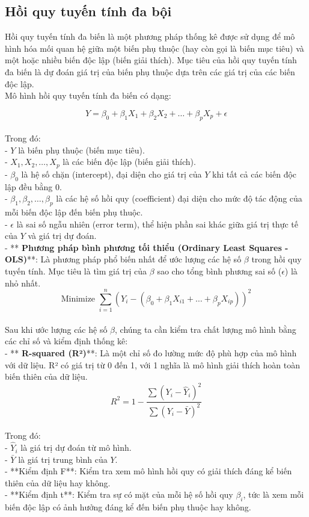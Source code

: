 \subsection{Hồi quy tuyến tính đa bội}
Hồi quy tuyến tính đa biến là một phương pháp thống kê được sử dụng để mô hình hóa mối quan hệ giữa một biến phụ thuộc (hay còn gọi là biến mục tiêu) và một hoặc nhiều biến độc lập (biến giải thích). Mục tiêu của hồi quy tuyến tính đa biến là dự đoán giá trị của biến phụ thuộc dựa trên các giá trị của các biến độc lập.\\
Mô hình hồi quy tuyến tính đa biến có dạng:

\[
Y = \beta_0 + \beta_1 X_1 + \beta_2 X_2 + \dots + \beta_p X_p + \epsilon
\]\\

Trong đó:\\
- \(Y\) là biến phụ thuộc (biến mục tiêu).\\
- \(X_1, X_2, \dots, X_p\) là các biến độc lập (biến giải thích).\\
- \(\beta_0\) là hệ số chặn (intercept), đại diện cho giá trị của \(Y\) khi tất cả các biến độc lập đều bằng 0.\\
- \(\beta_1, \beta_2, \dots, \beta_p\) là các hệ số hồi quy (coefficient) đại diện cho mức độ tác động của mỗi biến độc lập đến biến phụ thuộc.\\
- \(\epsilon\) là sai số ngẫu nhiên (error term), thể hiện phần sai khác giữa giá trị thực tế của \(Y\) và giá trị dự đoán.\\
- ** \textbf{Phương pháp bình phương tối thiểu (Ordinary Least Squares - OLS)}**: Là phương pháp phổ biến nhất để ước lượng các hệ số \(\beta\) trong hồi quy tuyến tính. Mục tiêu là tìm giá trị của \(\beta\) sao cho tổng bình phương sai số (\(\epsilon\)) là nhỏ nhất.\\
  
\[
\text{Minimize } \sum_{i=1}^{n} (Y_i - (\beta_0 + \beta_1 X_{i1} + \dots + \beta_p X_{ip}))^2
\]\\
Sau khi ước lượng các hệ số \(\beta\), chúng ta cần kiểm tra chất lượng mô hình bằng các chỉ số và kiểm định thống kê:\\

- ** \textbf{R-squared (R²)}**: Là một chỉ số đo lường mức độ phù hợp của mô hình với dữ liệu. R² có giá trị từ 0 đến 1, với 1 nghĩa là mô hình giải thích hoàn toàn biến thiên của dữ liệu.\\
  
  \[
  R^2 = 1 - \frac{\sum (Y_i - \hat{Y}_i)^2}{\sum (Y_i - \bar{Y})^2}
  \]\\
  
  Trong đó:\\
  - \(\hat{Y}_i\) là giá trị dự đoán từ mô hình.\\
  - \(\bar{Y}\) là giá trị trung bình của \(Y\).\\

- **Kiểm định F**: Kiểm tra xem mô hình hồi quy có giải thích đáng kể biến thiên của dữ liệu hay không.\\
- **Kiểm định t**: Kiểm tra sự có mặt của mỗi hệ số hồi quy \(\beta_i\), tức là xem mỗi biến độc lập có ảnh hưởng đáng kể đến biến phụ thuộc hay không.\\
